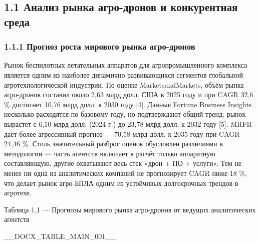 \documentclass[14pt,a4paper]{extarticle}
\begin{document}
\hypertarget{ux430ux43dux430ux43bux438ux437-ux440ux44bux43dux43aux430-ux430ux433ux440ux43e-ux434ux440ux43eux43dux43eux432-ux438-ux43aux43eux43dux43aux443ux440ux435ux43dux442ux43dux430ux44f-ux441ux440ux435ux434ux430}{%
\subsection{1.1 Анализ рынка агро-дронов и конкурентная среда}\label{ux430ux43dux430ux43bux438ux437-ux440ux44bux43dux43aux430-ux430ux433ux440ux43e-ux434ux440ux43eux43dux43eux432-ux438-ux43aux43eux43dux43aux443ux440ux435ux43dux442ux43dux430ux44f-ux441ux440ux435ux434ux430}}

\hypertarget{ux43fux440ux43eux433ux43dux43eux437-ux440ux43eux441ux442ux430-ux43cux438ux440ux43eux432ux43eux433ux43e-ux440ux44bux43dux43aux430-ux430ux433ux440ux43e-ux434ux440ux43eux43dux43eux432}{%
\subsubsection{1.1.1 Прогноз роста мирового рынка агро-дронов}\label{ux43fux440ux43eux433ux43dux43eux437-ux440ux43eux441ux442ux430-ux43cux438ux440ux43eux432ux43eux433ux43e-ux440ux44bux43dux43aux430-ux430ux433ux440ux43e-ux434ux440ux43eux43dux43eux432}}

Рынок беспилотных летательных аппаратов для агропромышленного комплекса является одним из наиболее динамично развивающихся сегментов глобальной агротехнологической индустрии. По оценке MarketsandMarkets, объём рынка агро-дронов составил около 2,63 млрд долл. США в 2025 году и при CAGR 32,6 \% достигнет 10,76 млрд долл. к 2030 году {[}4{]}. Данные Fortune Business Insights несколько расходятся по базовому году, но подтверждают общий тренд: рынок вырастет с 6,10 млрд долл. (2024 г.) до 23,78 млрд долл. к 2032 году {[}5{]}. MRFR даёт более агрессивный прогноз --- 70,58 млрд долл. к 2035 году при CAGR 24,46 \%. Столь значительный разброс оценок обусловлен различиями в методологии --- часть агентств включает в расчёт только аппаратную составляющую, другие охватывают весь стек «дрон + ПО + услуги». Тем не менее ни одна из аналитических компаний не прогнозирует CAGR ниже 18 \%, что делает рынок агро-БПЛА одним из устойчивых долгосрочных трендов в агротехе.

Таблица 1.1 --- Прогнозы мирового рынка агро-дронов от ведущих аналитических агентств



__DOCX_TABLE_MAIN_001__
\end{document}
